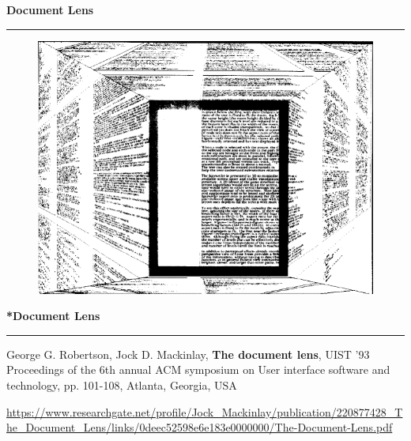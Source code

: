 \documentclass[pdf]{beamer}
\begin{document}
\begin{frame}
{\textbf{Document Lens}}{\textcolor{red}{\rule{12cm}{1.2pt}}}

\begin{figure}
\includegraphics[scale=0.5]{40_Picture1.png}
\end{figure}

\end{frame}



\begin{frame}
{\textbf{*Document Lens}}{\textcolor{red}{\rule{12cm}{1.2pt}}}

George G. Robertson, Jock D. Mackinlay, \textbf{The document lens}, UIST '93 Proceedings of the 6th annual ACM symposium on User interface software and technology, pp. 101-108, Atlanta, Georgia, USA 
\newline

\url{https://www.researchgate.net/profile/Jock_Mackinlay/publication/220877428_The_Document_Lens/links/0deec52598e6e183e0000000/The-Document-Lens.pdf}

\end{frame}
\end{document}
